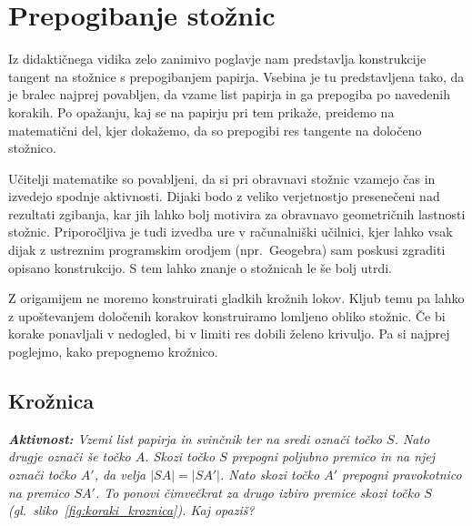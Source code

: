 \section{Prepogibanje stožnic}
\label{pogl:stoznice}


Iz didaktičnega vidika zelo zanimivo poglavje nam predstavlja konstrukcije tangent na stožnice s prepogibanjem papirja. Vsebina je tu predstavljena tako, da je bralec najprej povabljen, da vzame list papirja in ga prepogiba po navedenih korakih. Po opažanju, kaj se na papirju pri tem prikaže, preidemo na matematični del, kjer dokažemo, da so prepogibi res tangente na določeno stožnico.

Učitelji matematike so povabljeni, da si pri obravnavi stožnic vzamejo čas in izvedejo spodnje aktivnosti. Dijaki bodo z veliko verjetnostjo presenečeni nad rezultati zgibanja, kar jih lahko bolj motivira za obravnavo geometričnih lastnosti stožnic. Priporočljiva je tudi izvedba ure v računalniški učilnici, kjer lahko vsak dijak z ustreznim programskim orodjem (npr.\ Geogebra) sam poskusi zgraditi opisano konstrukcijo. S tem lahko znanje o stožnicah le še bolj utrdi.

Z origamijem ne moremo konstruirati gladkih krožnih lokov. Kljub temu pa lahko z upoštevanjem določenih korakov konstruiramo lomljeno obliko stožnic. Če bi korake ponavljali v nedogled, bi v limiti res dobili želeno krivuljo. Pa si najprej poglejmo, kako prepognemo krožnico.

\subsection{Krožnica}


\textit{\textbf{Aktivnost:} Vzemi list papirja in svinčnik ter na sredi označi točko $S$. Nato drugje označi še točko $A$. Skozi točko $S$ prepogni poljubno premico in na njej označi točko $A'$, da velja $|SA| = |SA'|$. Nato skozi točko $A'$ prepogni pravokotnico na premico $SA'$. To ponovi čimvečkrat za drugo izbiro premice skozi točko $S$ (gl.\ sliko~\ref{fig:koraki_kroznica}). Kaj opaziš?}

